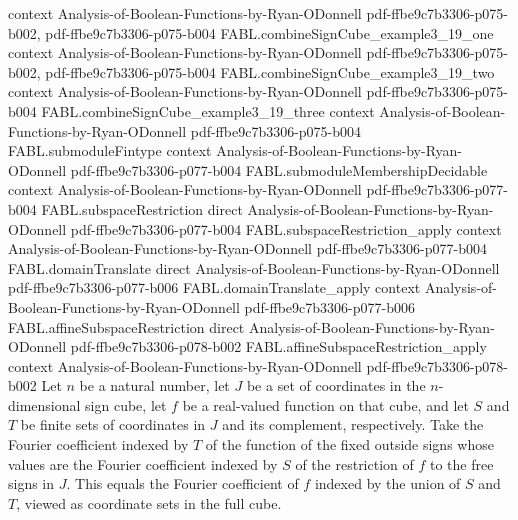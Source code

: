 \begin{theorem}
  {context}
  {Analysis-of-Boolean-Functions-by-Ryan-ODonnell}
  {pdf-ffbe9c7b3306-p075-b002,
    pdf-ffbe9c7b3306-p075-b004}
\proofstep
  {FABL.combineSignCube_example3_19_one}
  {context}
  {Analysis-of-Boolean-Functions-by-Ryan-ODonnell}
  {pdf-ffbe9c7b3306-p075-b002,
    pdf-ffbe9c7b3306-p075-b004}
\proofstep
  {FABL.combineSignCube_example3_19_two}
  {context}
  {Analysis-of-Boolean-Functions-by-Ryan-ODonnell}
  {pdf-ffbe9c7b3306-p075-b004}
\proofstep
  {FABL.combineSignCube_example3_19_three}
  {context}
  {Analysis-of-Boolean-Functions-by-Ryan-ODonnell}
  {pdf-ffbe9c7b3306-p075-b004}
\proofstep
  {FABL.submoduleFintype}
  {context}
  {Analysis-of-Boolean-Functions-by-Ryan-ODonnell}
  {pdf-ffbe9c7b3306-p077-b004}
\proofstep
  {FABL.submoduleMembershipDecidable}
  {context}
  {Analysis-of-Boolean-Functions-by-Ryan-ODonnell}
  {pdf-ffbe9c7b3306-p077-b004}
\proofstep
  {FABL.subspaceRestriction}
  {direct}
  {Analysis-of-Boolean-Functions-by-Ryan-ODonnell}
  {pdf-ffbe9c7b3306-p077-b004}
\proofstep
  {FABL.subspaceRestriction_apply}
  {context}
  {Analysis-of-Boolean-Functions-by-Ryan-ODonnell}
  {pdf-ffbe9c7b3306-p077-b004}
\proofstep
  {FABL.domainTranslate}
  {direct}
  {Analysis-of-Boolean-Functions-by-Ryan-ODonnell}
  {pdf-ffbe9c7b3306-p077-b006}
\proofstep
  {FABL.domainTranslate_apply}
  {context}
  {Analysis-of-Boolean-Functions-by-Ryan-ODonnell}
  {pdf-ffbe9c7b3306-p077-b006}
\proofstep
  {FABL.affineSubspaceRestriction}
  {direct}
  {Analysis-of-Boolean-Functions-by-Ryan-ODonnell}
  {pdf-ffbe9c7b3306-p078-b002}
\proofstep
  {FABL.affineSubspaceRestriction_apply}
  {context}
  {Analysis-of-Boolean-Functions-by-Ryan-ODonnell}
  {pdf-ffbe9c7b3306-p078-b002}
Let $n$ be a natural number, let $J$ be a set of coordinates in the $n$-dimensional sign
cube, let $f$ be a real-valued function on that cube, and let $S$ and $T$ be finite sets
of coordinates in $J$ and its complement, respectively. Take the Fourier coefficient
indexed by $T$ of the function of the fixed outside signs whose values are the Fourier
coefficient indexed by $S$ of the restriction of $f$ to the free signs in $J$. This
equals the Fourier coefficient of $f$ indexed by the union of $S$ and $T$, viewed as
coordinate sets in the full cube.
\end{theorem}

